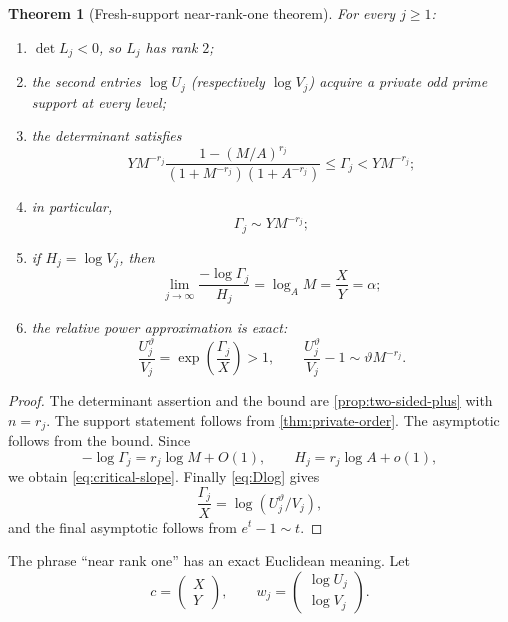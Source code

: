 \documentclass[11pt]{article}
\newtheorem{theorem}{Theorem}[section]
\theoremstyle{definition}
\newcommand{\vtheta}{\vartheta}
\begin{document}
\begin{theorem}[Fresh-support near-rank-one theorem]\label{thm:fresh-rank-one}
For every $j\ge1$:
\begin{enumerate}[label=\textup{(\roman*)}]
\item $\det L_j<0$, so $L_j$ has rank $2$;
\item the second entries $\log U_j$ (respectively $\log V_j$) acquire a private odd prime
support at every level;
\item the determinant satisfies
\begin{equation}\label{eq:Gamma-bound}
 Y M^{-r_j}
 \frac{1-(M/A)^{r_j}}{(1+M^{-r_j})(1+A^{-r_j})}
 \le\Gamma_j<Y M^{-r_j};
\end{equation}
\item in particular,
\begin{equation}\label{eq:Gamma-asymp}
 \Gamma_j\sim Y M^{-r_j};
\end{equation}
\item if $H_j=\log V_j$, then
\begin{equation}\label{eq:critical-slope}
 \lim_{j\to\infty}\frac{-\log\Gamma_j}{H_j}
 =\log_A M
 =\frac{X}{Y}=\alpha;
\end{equation}
\item the relative power approximation is exact:
\begin{equation}\label{eq:relative-power}
 \frac{U_j^{\vtheta}}{V_j}
 =\exp\!\left(\frac{\Gamma_j}{X}\right)>1,
 \qquad
 \frac{U_j^{\vtheta}}{V_j}-1\sim\vtheta M^{-r_j}.
\end{equation}
\end{enumerate}
\end{theorem}

\begin{proof}
The determinant assertion and the bound are \cref{prop:two-sided-plus} with $n=r_j$.
The support statement follows from \cref{thm:private-order}.  The asymptotic follows from
the bound.  Since
\[
 -\log\Gamma_j=r_j\log M+O(1),
 \qquad
 H_j=r_j\log A+o(1),
\]
we obtain \eqref{eq:critical-slope}.  Finally \eqref{eq:Dlog} gives
\[
 \frac{\Gamma_j}{X}=\log(U_j^{\vtheta}/V_j),
\]
and the final asymptotic follows from $e^t-1\sim t$.
\end{proof}

The phrase ``near rank one'' has an exact Euclidean meaning.  Let
\[
 c=\begin{pmatrix}X\\Y\end{pmatrix},
 \qquad
 w_j=\begin{pmatrix}\log U_j\\\log V_j\end{pmatrix}.
\]
\end{document}
